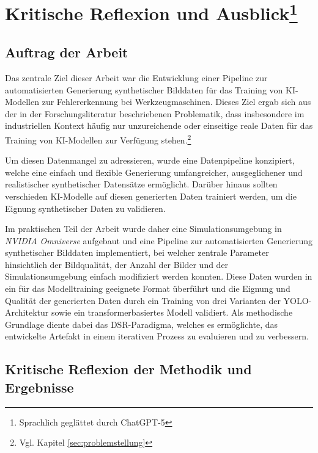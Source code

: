 \chapter[Kritische Reflexion und Ausblick]{Kritische Reflexion und Ausblick\footnote{Sprachlich geglättet durch ChatGPT-5}}
\label{chapter:Ergebnisdiskussion}

\section{Auftrag der Arbeit}
Das zentrale Ziel dieser Arbeit war die Entwicklung einer Pipeline zur automatisierten Generierung synthetischer Bilddaten für das Training von \ac{KI}-Modellen zur Fehlererkennung bei Werkzeugmaschinen. Dieses Ziel ergab sich aus der in der Forschungsliteratur beschriebenen Problematik, dass insbesondere im industriellen Kontext häufig nur unzureichende oder einseitige reale Daten für das Training von \ac{KI}-Modellen zur Verfügung stehen.\footnote{Vgl. Kapitel \ref{sec:problemstellung}}

Um diesen Datenmangel zu adressieren, wurde eine Datenpipeline konzipiert, welche eine einfach und flexible Generierung umfangreicher, ausgeglichener und realistischer synthetischer Datensätze ermöglicht. Darüber hinaus sollten verschieden \ac{KI}-Modelle auf diesen generierten Daten trainiert werden, um die Eignung synthetischer Daten zu validieren.

Im praktischen Teil der Arbeit wurde daher eine Simulationsumgebung in \textit{NVIDIA Omniverse} aufgebaut und eine Pipeline zur automatisierten Generierung synthetischer Bilddaten implementiert, bei welcher zentrale Parameter hinsichtlich der Bildqualität, der Anzahl der Bilder und der Simulationsumgebung einfach modifiziert werden konnten. Diese Daten wurden in ein für das Modelltraining geeignete Format überführt und die Eignung und Qualität der generierten Daten durch ein Training von drei Varianten der \ac{YOLO}-Architektur sowie ein transformerbasiertes Modell validiert. Als methodische Grundlage diente dabei das \ac{DSR}-Paradigma, welches es ermöglichte, das entwickelte Artefakt in einem iterativen Prozess zu evaluieren und zu verbessern.


\section{Kritische Reflexion der Methodik und Ergebnisse}

